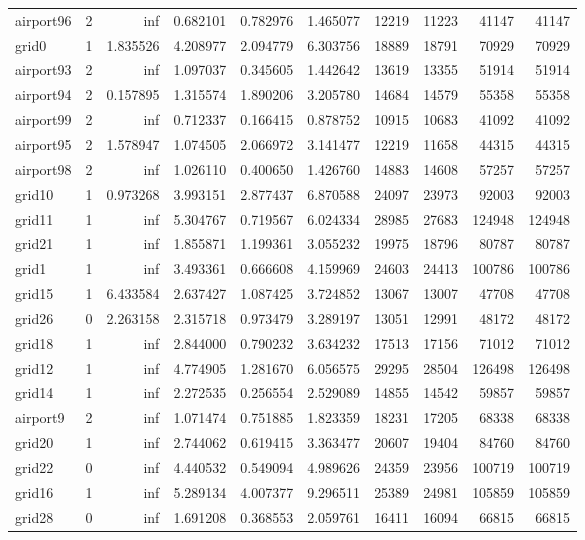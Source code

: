 \begin{longtable}{|l|r|r|r|r|r|r|r|r|r|}
airport96 & 2 & inf & 0.682101 & 0.782976 & 1.465077 & 12219 & 11223 & 41147 & 41147 \\
grid0 & 1 & 1.835526 & 4.208977 & 2.094779 & 6.303756 & 18889 & 18791 & 70929 & 70929 \\
airport93 & 2 & inf & 1.097037 & 0.345605 & 1.442642 & 13619 & 13355 & 51914 & 51914 \\
airport94 & 2 & 0.157895 & 1.315574 & 1.890206 & 3.205780 & 14684 & 14579 & 55358 & 55358 \\
airport99 & 2 & inf & 0.712337 & 0.166415 & 0.878752 & 10915 & 10683 & 41092 & 41092 \\
airport95 & 2 & 1.578947 & 1.074505 & 2.066972 & 3.141477 & 12219 & 11658 & 44315 & 44315 \\
airport98 & 2 & inf & 1.026110 & 0.400650 & 1.426760 & 14883 & 14608 & 57257 & 57257 \\
grid10 & 1 & 0.973268 & 3.993151 & 2.877437 & 6.870588 & 24097 & 23973 & 92003 & 92003 \\
grid11 & 1 & inf & 5.304767 & 0.719567 & 6.024334 & 28985 & 27683 & 124948 & 124948 \\
grid21 & 1 & inf & 1.855871 & 1.199361 & 3.055232 & 19975 & 18796 & 80787 & 80787 \\
grid1 & 1 & inf & 3.493361 & 0.666608 & 4.159969 & 24603 & 24413 & 100786 & 100786 \\
grid15 & 1 & 6.433584 & 2.637427 & 1.087425 & 3.724852 & 13067 & 13007 & 47708 & 47708 \\
grid26 & 0 & 2.263158 & 2.315718 & 0.973479 & 3.289197 & 13051 & 12991 & 48172 & 48172 \\
grid18 & 1 & inf & 2.844000 & 0.790232 & 3.634232 & 17513 & 17156 & 71012 & 71012 \\
grid12 & 1 & inf & 4.774905 & 1.281670 & 6.056575 & 29295 & 28504 & 126498 & 126498 \\
grid14 & 1 & inf & 2.272535 & 0.256554 & 2.529089 & 14855 & 14542 & 59857 & 59857 \\
airport9 & 2 & inf & 1.071474 & 0.751885 & 1.823359 & 18231 & 17205 & 68338 & 68338 \\
grid20 & 1 & inf & 2.744062 & 0.619415 & 3.363477 & 20607 & 19404 & 84760 & 84760 \\
grid22 & 0 & inf & 4.440532 & 0.549094 & 4.989626 & 24359 & 23956 & 100719 & 100719 \\
grid16 & 1 & inf & 5.289134 & 4.007377 & 9.296511 & 25389 & 24981 & 105859 & 105859 \\
grid28 & 0 & inf & 1.691208 & 0.368553 & 2.059761 & 16411 & 16094 & 66815 & 66815 \\

\end{longtable}
